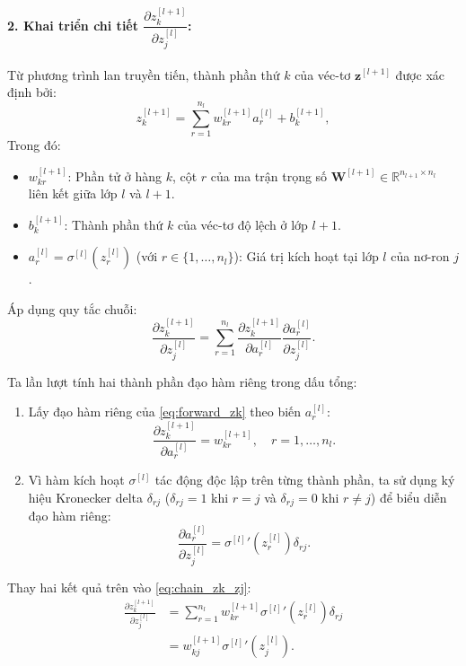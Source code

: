 \paragraph{2. Khai triển chi tiết $\dfrac{\partial z_k^{[l+1]}}{\partial z_j^{[l]}}$:}
Từ phương trình lan truyền tiến, thành phần thứ $k$ của véc-tơ $\mathbf{z}^{[l+1]}$ được xác định bởi:
\begin{equation}
z_k^{[l+1]} = \sum_{r=1}^{n_l} w_{kr}^{[l+1]} a_r^{[l]} + b_k^{[l+1]},
\label{eq:forward_zk}
\end{equation}
Trong đó:
\begin{itemize}
    \item $w_{kr}^{[l+1]}$: Phần tử ở hàng $k$, cột $r$ của ma trận trọng số $\mathbf{W}^{[l+1]} \in \mathbb{R}^{n_{l+1} \times n_l}$ liên kết giữa lớp $l$ và $l+1$.
    \item $b_k^{[l+1]}$: Thành phần thứ $k$ của véc-tơ độ lệch ở lớp $l+1$.
    \item $a_r^{[l]} = \sigma^{[l]}\!\left(z_r^{[l]}\right)$ (với $r \in \{1, \dots, n_l\}$): Giá trị kích hoạt tại lớp $l$ của nơ-ron $j$.
\end{itemize}
Áp dụng quy tắc chuỗi:
\begin{equation}
\frac{\partial z_k^{[l+1]}}{\partial z_j^{[l]}} = \sum_{r=1}^{n_l} \frac{\partial z_k^{[l+1]}}{\partial a_r^{[l]}} \frac{\partial a_r^{[l]}}{\partial z_j^{[l]}}.
\label{eq:chain_zk_zj}
\end{equation}

Ta lần lượt tính hai thành phần đạo hàm riêng trong dấu tổng:
\begin{enumerate}
    \item Lấy đạo hàm riêng của \eqref{eq:forward_zk} theo biến $a_r^{[l]}$:
    \begin{equation}
    \frac{\partial z_k^{[l+1]}}{\partial a_r^{[l]}} = w_{kr}^{[l+1]}, \quad r = 1, \dots, n_l.
    \end{equation}
    \item Vì hàm kích hoạt $\sigma^{[l]}$ tác động độc lập trên từng thành phần, ta sử dụng ký hiệu Kronecker delta $\delta_{rj}$ ($\delta_{rj} = 1$ khi $r = j$ và $\delta_{rj} = 0$ khi $r \neq j$) để biểu diễn đạo hàm riêng:
    \begin{equation}
    \frac{\partial a_r^{[l]}}{\partial z_j^{[l]}} = {\sigma^{[l]}}'\!\left(z_r^{[l]}\right) \delta_{rj}.
    \end{equation}
\end{enumerate}

Thay hai kết quả trên vào \eqref{eq:chain_zk_zj}:
\begin{equation}
\begin{aligned}
    \frac{\partial z_k^{[l+1]}}{\partial z_j^{[l]}} &= \sum_{r=1}^{n_l} w_{kr}^{[l+1]} {\sigma^{[l]}}'\!\left(z_r^{[l]}\right) \delta_{rj} \\[6pt]
    &= w_{kj}^{[l+1]} {\sigma^{[l]}}'\!\left(z_j^{[l]}\right).
\end{aligned}
\label{eq:zk_zj_final}
\end{equation}

